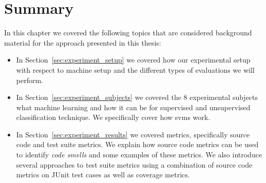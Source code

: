 \section{Summary}
\label{sec:experiment_summary}
In this chapter we covered the following topics that are considered background material for the approach presented in this thesis:

\begin{itemize}
  \item In Section~\ref{sec:experiment_setup} we covered how our experimental setup with respect to machine setup and the different types of evaluations we will perform.
  \item In Section~\ref{sec:experiment_subjects} we covered the 8 experimental subjects what machine learning and how it can be for supervised and unsupervised classification technique. We specifically cover how \gls{svm}s work.
  \item In Section~\ref{sec:experiment_results} we covered metrics, specifically source code and test suite metrics. We explain how source code metrics can be used to identify \emph{code smells} and some examples of these metrics. We also introduce several approaches to test suite metrics using a combination of source code metrics on JUnit test cases as well as coverage metrics.
\end{itemize}
